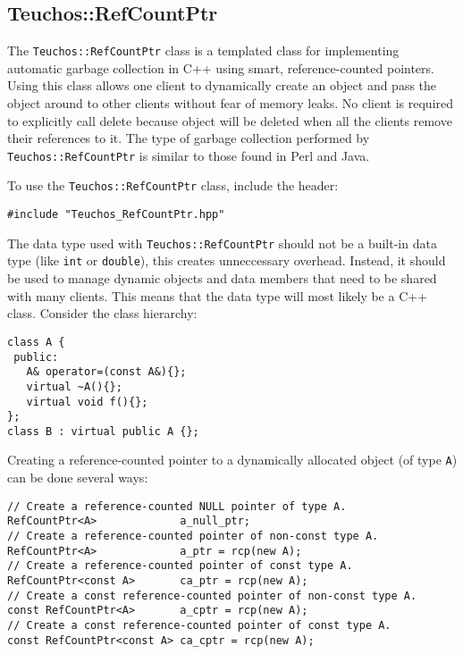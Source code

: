 
\subsection{Teuchos::RefCountPtr}
\label{sec:teuchos:RefCountPtr}

The \verb!Teuchos::RefCountPtr! class is a templated class for implementing
automatic garbage collection in C++ using smart, reference-counted pointers.
Using this class allows one client to dynamically create an object and pass
the object around to other clients without fear of memory leaks.  
No client is required to explicitly
call delete because object will be deleted when all the clients remove their
references to it.  The type of garbage collection performed by \verb!Teuchos::RefCountPtr! is similar to those found in Perl and Java.

To use the \verb!Teuchos::RefCountPtr! class, include the header:
{\small 
\begin{verbatim}
#include "Teuchos_RefCountPtr.hpp"
\end{verbatim}}
The data type used with {\tt Teuchos::RefCountPtr} should not 
be a built-in data type (like {\tt int} or {\tt double}), this creates unneccessary 
overhead.  Instead, it should be used to manage dynamic objects 
and data members that need to be shared with many clients.  This means that the data type 
will most likely be a C++ class.  Consider the class hierarchy:
{\small
\begin{verbatim}
class A { 
 public: 
   A& operator=(const A&){}; 
   virtual ~A(){}; 
   virtual void f(){}; 
};   
class B : virtual public A {};
\end{verbatim}}

Creating a reference-counted pointer to a dynamically allocated object (of type {\tt A}) can be done several ways:

{\small 
\begin{verbatim}
// Create a reference-counted NULL pointer of type A.
RefCountPtr<A>	           a_null_ptr;
// Create a reference-counted pointer of non-const type A.
RefCountPtr<A>             a_ptr = rcp(new A);
// Create a reference-counted pointer of const type A.
RefCountPtr<const A>       ca_ptr = rcp(new A);
// Create a const reference-counted pointer of non-const type A.
const RefCountPtr<A>       a_cptr = rcp(new A); 
// Create a const reference-counted pointer of const type A.
const RefCountPtr<const A> ca_cptr = rcp(new A); 
\end{verbatim}}

